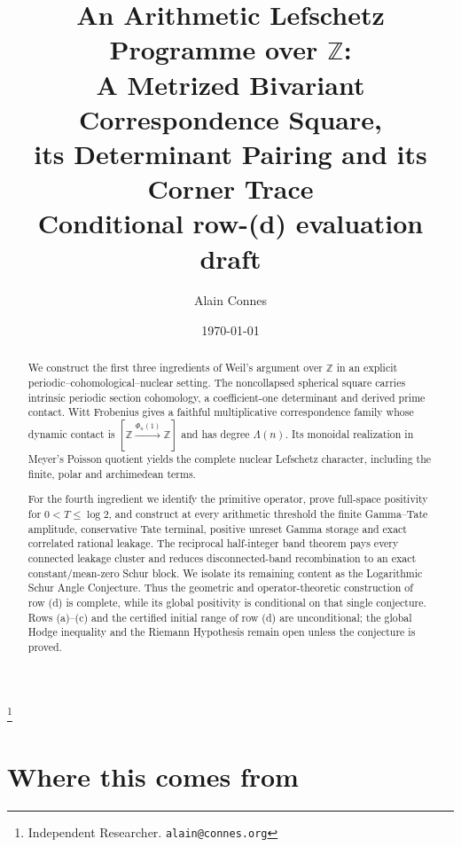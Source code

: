 \documentclass[11pt]{amsart}
\theoremstyle{definition}
\theoremstyle{remark}
\newcommand{\Z}{\mathbb Z}
\begin{document}
\title[An arithmetic Lefschetz programme over $\Z$]
{An Arithmetic Lefschetz Programme over $\Z$:\\
A Metrized Bivariant Correspondence Square,\\
its Determinant Pairing and its Corner Trace\\[4pt]
\large Conditional row-(d) evaluation draft}

\author{Alain Connes}
\thanks{Independent Researcher. \texttt{alain@connes.org}}

\date{\today}

\begin{abstract}
We construct the first three ingredients of Weil's argument over $\Z$ in an
explicit periodic--cohomological--nuclear setting.  The noncollapsed
spherical square carries intrinsic periodic section cohomology, a
coefficient-one determinant and derived prime contact.  Witt Frobenius gives
a faithful multiplicative correspondence family whose dynamic contact is
$[\Z\xrightarrow{\Phi_n(1)}\Z]$ and has degree $\Lambda(n)$.  Its monoidal
realization in Meyer's Poisson quotient yields the complete nuclear
Lefschetz character, including the finite, polar and archimedean terms.

For the fourth ingredient we identify the primitive operator, prove
full-space positivity for $0<T\leq\log2$, and construct at every arithmetic
threshold the finite Gamma--Tate amplitude, conservative Tate terminal,
positive unreset Gamma storage and exact correlated rational leakage.  The
reciprocal half-integer band theorem pays every connected leakage cluster
and reduces disconnected-band recombination to an exact constant/mean-zero
Schur block.  We isolate its remaining content as the Logarithmic Schur
Angle Conjecture.  Thus the geometric and operator-theoretic construction of
row (d) is complete, while its global positivity is conditional on that
single conjecture.  Rows (a)--(c) and the certified initial range of row (d)
are unconditional; the global Hodge inequality and the Riemann Hypothesis
remain open unless the conjecture is proved.
\end{abstract}


\maketitle

\section{Where this comes from}
\end{document}
